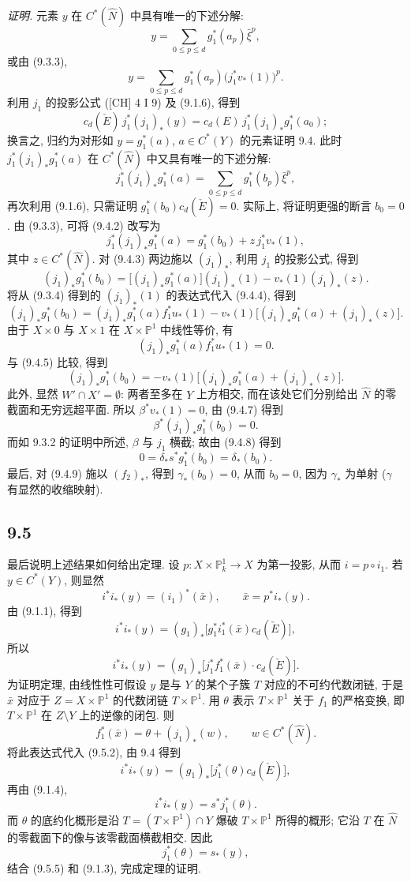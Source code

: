 \emph{证明.} 元素 $y$ 在 $C^*(\widehat N)$ 中具有唯一的下述分解:
\[
y=\sum_{0\le p\le d}g_1^*(a_p)\bar\xi^p,
\]
或由 (9.3.3),
\[
y=\sum_{0\le p\le d}g_1^*(a_p)\bigl(j_1^*v_*(1)\bigr)^p.
\tag{9.4.1}
\]
利用 $j_1$ 的投影公式 ([CH] 4 I 9) 及 (9.1.6), 得到
\[
c_d(\check E)\,j_1^*(j_1)_*(y)=c_d(E)\,j_1^*(j_1)_*g_1^*(a_0);
\]
换言之, 归约为对形如 $y=g_1^*(a)$, $a\in C^*(Y)$ 的元素证明 9.4. 此时 $j_1^*(j_1)_*g_1^*(a)$ 在 $C^*(\widehat N)$ 中又具有唯一的下述分解:
\[
j_1^*(j_1)_*g_1^*(a)=\sum_{0\le p\le d}g_1^*(b_p)\bar\xi^p,
\tag{9.4.2}
\]
再次利用 (9.1.6), 只需证明 $g_1^*(b_0)c_d(\check E)=0$. 实际上, 将证明更强的断言 $b_0=0$. 由 (9.3.3), 可将 (9.4.2) 改写为
\[
j_1^*(j_1)_*g_1^*(a)=g_1^*(b_0)+z\,j_1^*v_*(1),
\tag{9.4.3}
\]
其中 $z\in C^*(\widehat N)$. 对 (9.4.3) 两边施以 $(j_1)_*$, 利用 $j_1$ 的投影公式, 得到
\[
(j_1)_*g_1^*(b_0)=\bigl[(j_1)_*g_1^*(a)\bigr](j_1)_*(1)-v_*(1)(j_1)_*(z).
\tag{9.4.4}
\]
将从 (9.3.4) 得到的 $(j_1)_*(1)$ 的表达式代入 (9.4.4), 得到
\[
(j_1)_*g_1^*(b_0)=
(j_1)_*g_1^*(a)f_1^*u_*(1)-v_*(1)\bigl[(j_1)_*g_1^*(a)+(j_1)_*(z)\bigr].
\tag{9.4.5}
\]
由于 $X\times0$ 与 $X\times1$ 在 $X\times\mathbb P^1$ 中线性等价, 有
\[
(j_1)_*g_1^*(a)f_1^*u_*(1)=0.
\tag{9.4.6}
\]
与 (9.4.5) 比较, 得到
\[
(j_1)_*g_1^*(b_0)=-v_*(1)\bigl[(j_1)_*g_1^*(a)+(j_1)_*(z)\bigr].
\tag{9.4.7}
\]
此外, 显然 $W'\cap X'=\emptyset$: 两者至多在 $Y$ 上方相交, 而在该处它们分别给出 $\widehat N$ 的零截面和无穷远超平面. 所以 $\beta^*v_*(1)=0$, 由 (9.4.7) 得到
\[
\beta^*(j_1)_*g_1^*(b_0)=0.
\tag{9.4.8}
\]
而如 9.3.2 的证明中所述, $\beta$ 与 $j_1$ 横截; 故由 (9.4.8) 得到
\[
0=\delta_*s^*g_1^*(b_0)=\delta_*(b_0).
\tag{9.4.9}
\]
最后, 对 (9.4.9) 施以 $(f_2)_*$, 得到 $\gamma_*(b_0)=0$, 从而 $b_0=0$, 因为 $\gamma_*$ 为单射 ($\gamma$ 有显然的收缩映射).

\subsection*{9.5}

最后说明上述结果如何给出定理. 设 $p:X\times\mathbb P^1_k\to X$ 为第一投影, 从而 $i=p\circ i_1$. 若 $y\in C^*(Y)$, 则显然
\[
i^*i_*(y)=(i_1)^*(\bar x),\qquad \bar x=p^*i_*(y).
\tag{9.5.1}
\]
由 (9.1.1), 得到
\[
i^*i_*(y)=(g_1)_*\bigl[g_1^*i_1^*(\bar x)c_d(\check E)\bigr],
\]
所以
\[
i^*i_*(y)=(g_1)_*\bigl[j_1^*f_1^*(\bar x)\cdot c_d(\check E)\bigr].
\tag{9.5.2}
\]
为证明定理, 由线性性可假设 $y$ 是与 $Y$ 的某个子簇 $T$ 对应的不可约代数闭链, 于是 $\bar x$ 对应于 $Z=X\times\mathbb P^1$ 的代数闭链 $T\times\mathbb P^1$. 用 $\theta$ 表示 $T\times\mathbb P^1$ 关于 $f_1$ 的严格变换, 即 $T\times\mathbb P^1$ 在 $Z\setminus Y$ 上的逆像的闭包. 则
\[
f_1^*(\bar x)=\theta+(j_1)_*(w),\qquad w\in C^*(\widehat N).
\tag{9.5.3}
\]
将此表达式代入 (9.5.2), 由 9.4 得到
\[
i^*i_*(y)=(g_1)_*\bigl[j_1^*(\theta)c_d(\check E)\bigr],
\tag{9.5.4}
\]
再由 (9.1.4),
\[
i^*i_*(y)=s^*j_1^*(\theta).
\tag{9.5.5}
\]
而 $\theta$ 的底约化概形是沿 $T=(T\times\mathbb P^1)\cap Y$ 爆破 $T\times\mathbb P^1$ 所得的概形; 它沿 $T$ 在 $\widehat N$ 的零截面下的像与该零截面横截相交. 因此
\[
j_1^*(\theta)=s_*(y),
\]
结合 (9.5.5) 和 (9.1.3), 完成定理的证明.

